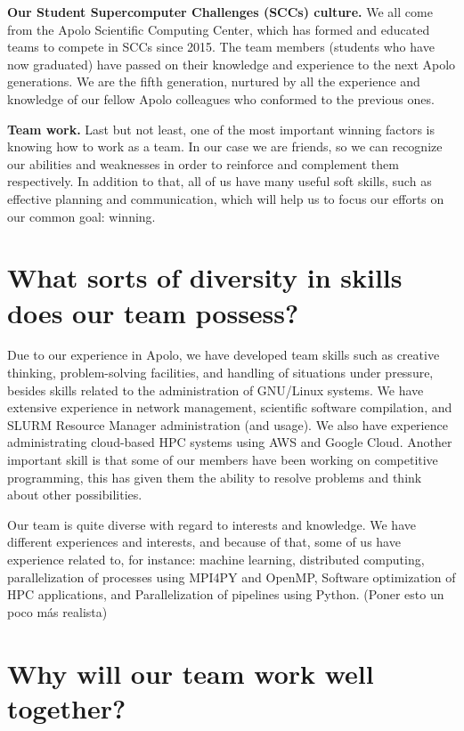 \documentclass[11pt,a4paper,twocolumn]{article}
\begin{document}
    \textbf{Our Student Supercomputer Challenges (SCCs) culture.} We all come from the Apolo Scientific Computing Center, which has formed and educated teams to compete in SCCs since 2015. The team members (students who have now graduated) have passed on their knowledge and experience to the next Apolo generations. We are the fifth generation, nurtured by all the experience and knowledge of our fellow Apolo colleagues who conformed to the previous ones.

    \textbf{Team work.} Last but not least, one of the most important winning factors is knowing how to work as a team. In our case we are friends, so we can recognize our abilities and weaknesses in order to reinforce and complement them respectively. In addition to that, all of us have many useful soft skills, such as effective planning and communication, which will help us to focus our efforts on our common goal: winning.

    \section{What sorts of diversity in skills does our team possess?}

    Due to our experience in Apolo, we have developed team skills such as creative thinking, problem-solving facilities, and handling of situations under pressure, besides skills related to the administration of GNU/Linux systems. We have extensive experience in network management, scientific software compilation, and SLURM Resource Manager administration (and usage). We also have experience administrating cloud-based HPC systems using AWS and Google Cloud. Another important skill is that some of our members have been working on competitive programming, this has given them the ability to resolve problems and think about other possibilities.

    Our team is quite diverse with regard to interests and knowledge. We have different experiences and interests, and because of that, some of us have experience related to, for instance: machine learning, distributed computing, parallelization of processes using MPI4PY and OpenMP, Software optimization of HPC applications, and Parallelization of pipelines using Python. (Poner esto un poco más realista)

    \section{Why will our team work well together?}
\end{document}
